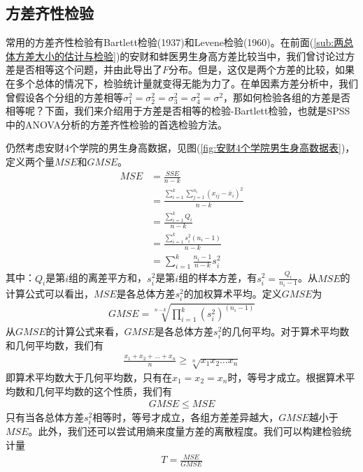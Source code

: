     \subsection{方差齐性检验}
        \par
        常用的方差齐性检验有Bartlett检验(1937)和Levene检验(1960)。在前面(\ref{sub:两总体方差大小的估计与检验})的安财和蚌医男生身高方差比较当中，我们曾讨论过方差是否相等这个问题，并由此导出了$F$分布。但是，这仅是两个方差的比较，如果在多个总体的情况下，检验统计量就变得无能为力了。在单因素方差分析中，我们曾假设各个分组的方差相等$\sigma_1^2=\sigma_2^2=\sigma_3^2=\sigma_4^2=\sigma^2$，那如何检验各组的方差是否相等呢？下面，我们来介绍用于方差是否相等的检验-Bartlett检验，也就是SPSS中的ANOVA分析的方差齐性检验的首选检验方法。
        \par
        仍然考虑安财4个学院的男生身高数据，见图(\ref{fig:安财4个学院男生身高数据表})，定义两个量$MSE$和$GMSE$。
        \begin{align*}
        MSE &= \frac{SSE}{n-k}\\
        &= \frac{\sum_{i = 1}^k\sum_{j=1}^{n_i}(x_{ij} - \bar{x}_i)^2}{n-k}\\
        &=\frac{\sum_{i=1}^k Q_i}{n-k}\\
        &=\frac{\sum_{i=1}^ks_i^2(n_i-1)}{n-k}\\
        &=\sum_{i = 1}^k \frac{n_i-1}{n-k}s_i^2
        \end{align*}
        其中：$ Q_i$是第$i$组的离差平方和，$s_i^2$是第$i$组的样本方差，有$s_i^2 = \frac{Q_i}{n_i-1}$。从$MSE$的计算公式可以看出，$MSE$是各总体方差$s_i^2$的加权算术平均。定义$GMSE$为
        \begin{align*}
        GMSE = \sqrt[n-k]{\prod_{i = 1}^k(s_i^2)^{(n_i-1)}}
        \end{align*}
        从$GMSE$的计算公式来看，$GMSE$是各总体方差$s_i^2$的几何平均。对于算术平均数和几何平均数，我们有
        \begin{align*}
        \frac{x_1+x_2+\dots+x_n}{n} \geqslant \sqrt[n]{x_1x_2\dots x_n}
        \end{align*}
        即算术平均数大于几何平均数，只有在$x_1 = x_2 = x_n$时，等号才成立。根据算术平均数和几何平均数的这个性质，我们有
        \begin{align*}
        GMSE \leqslant MSE
        \end{align*}
        只有当各总体方差$s_i^2$相等时，等号才成立，各组方差差异越大，$GMSE$越小于$MSE$。此外，我们还可以尝试用熵来度量方差的离散程度。我们可以构建检验统计量
        \begin{align*}
        T = \frac{MSE}{GMSE}
        \end{align*}
